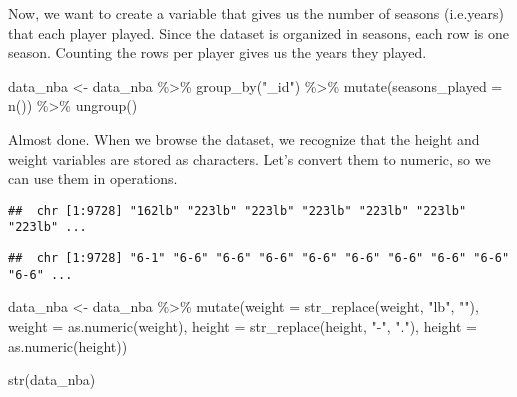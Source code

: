 \documentclass[
]{book}
\newenvironment{Shaded}{\begin{snugshade}}{\end{snugshade}}
\newcommand{\AttributeTok}[1]{\textcolor[rgb]{0.77,0.63,0.00}{#1}}
\newcommand{\AttributeTok}[1]{\textcolor[rgb]{0.13,0.29,0.53}{#1}}
\newcommand{\FunctionTok}[1]{\textcolor[rgb]{0.00,0.00,0.00}{#1}}
\newcommand{\FunctionTok}[1]{\textcolor[rgb]{0.13,0.29,0.53}{\textbf{#1}}}
\newcommand{\NormalTok}[1]{#1}
\newcommand{\OtherTok}[1]{\textcolor[rgb]{0.56,0.35,0.01}{#1}}
\newcommand{\SpecialCharTok}[1]{\textcolor[rgb]{0.00,0.00,0.00}{#1}}
\newcommand{\SpecialCharTok}[1]{\textcolor[rgb]{0.81,0.36,0.00}{\textbf{#1}}}
\newcommand{\StringTok}[1]{\textcolor[rgb]{0.31,0.60,0.02}{#1}}
\begin{document}
Now, we want to create a variable that gives us the number of seasons (i.e.years)
that each player played. Since the dataset is organized in seasons, each row
is one season. Counting the rows per player gives us the years they played.

\begin{Shaded}
\begin{Highlighting}[]
\NormalTok{data\_nba }\OtherTok{\textless{}{-}}\NormalTok{ data\_nba }\SpecialCharTok{\%\textgreater{}\%}
  \FunctionTok{group\_by}\NormalTok{(}\StringTok{"\_id"}\NormalTok{) }\SpecialCharTok{\%\textgreater{}\%}
  \FunctionTok{mutate}\NormalTok{(}\AttributeTok{seasons\_played =} \FunctionTok{n}\NormalTok{()) }\SpecialCharTok{\%\textgreater{}\%}
  \FunctionTok{ungroup}\NormalTok{()}
\end{Highlighting}
\end{Shaded}

Almost done. When we browse the dataset, we recognize that the height and weight variables are stored as characters. Let's convert them to numeric, so we can
use them in operations.

\begin{Shaded}
\end{Shaded}

\begin{verbatim}
##  chr [1:9728] "162lb" "223lb" "223lb" "223lb" "223lb" "223lb" "223lb" ...
\end{verbatim}

\begin{Shaded}
\end{Shaded}

\begin{verbatim}
##  chr [1:9728] "6-1" "6-6" "6-6" "6-6" "6-6" "6-6" "6-6" "6-6" "6-6" "6-6" ...
\end{verbatim}

\begin{Shaded}
\begin{Highlighting}[]
\NormalTok{data\_nba }\OtherTok{\textless{}{-}}\NormalTok{ data\_nba }\SpecialCharTok{\%\textgreater{}\%}
  \FunctionTok{mutate}\NormalTok{(}\AttributeTok{weight =} \FunctionTok{str\_replace}\NormalTok{(weight, }\StringTok{"lb"}\NormalTok{, }\StringTok{""}\NormalTok{),}
         \AttributeTok{weight =} \FunctionTok{as.numeric}\NormalTok{(weight),}
         \AttributeTok{height =} \FunctionTok{str\_replace}\NormalTok{(height, }\StringTok{"{-}"}\NormalTok{, }\StringTok{"."}\NormalTok{),}
         \AttributeTok{height =} \FunctionTok{as.numeric}\NormalTok{(height))}

\FunctionTok{str}\NormalTok{(data\_nba)}
\end{Highlighting}
\end{Shaded}
\end{document}
